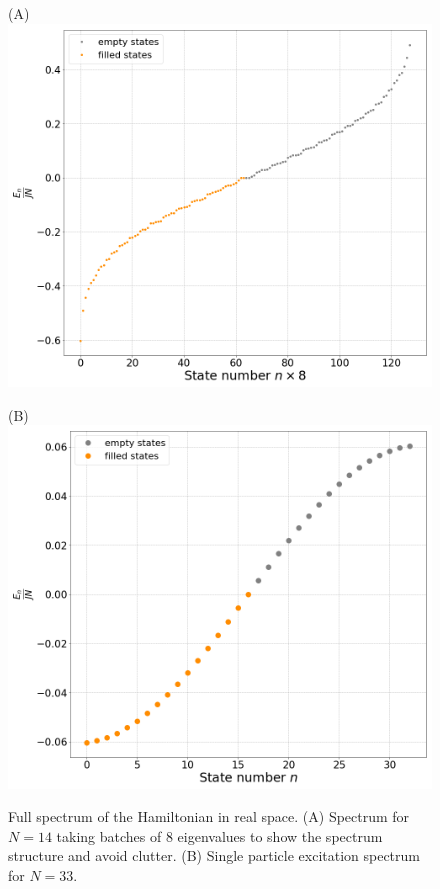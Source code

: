 \begin{figure}[htb]
    \centering
    \begin{minipage}{.5\textwidth}
    \centering(A)
    \includegraphics[scale=0.18]{figures/FreeFullSpecBatch_m0_L10.png}
    \end{minipage}%
    \begin{minipage}{0.5\textwidth}
    \centering(B)
    \includegraphics[scale=0.182]{figures/FreeFullSpecBatch_m0_L33.png}
    \end{minipage}
     \caption{Full spectrum of the Hamiltonian in real space. (A) Spectrum for $N=14$ taking batches of 8 eigenvalues to show the spectrum structure and avoid clutter. (B) Single particle excitation spectrum for $N=33$.}
    \label{fig:masslesFullSpecB}
\end{figure}

